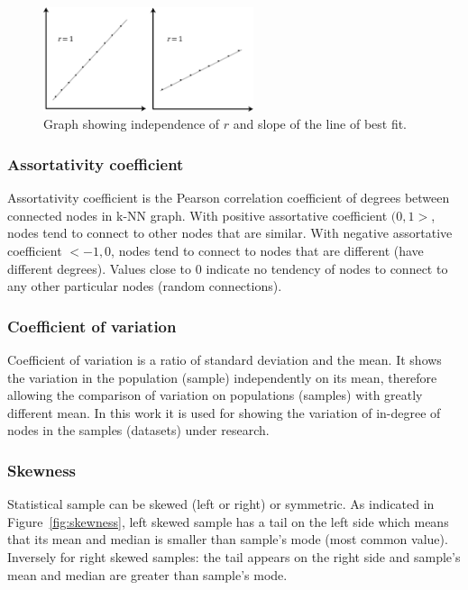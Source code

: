 \begin{figure}[h!]
  \centering
  \captionsetup{width=24pc, justification=centering}
    \includegraphics[width=0.55\textwidth]{images/pearson_graphs_slope.png}
  \caption{Graph showing independence of $r$ and slope of the line of best fit.}
  \label{fig:pearson_graph_slope}
\end{figure}

\subsubsection{Assortativity coefficient}
Assortativity coefficient is the Pearson correlation coefficient of degrees between connected nodes in k-NN graph.
With positive assortative coefficient $(0, 1>$, nodes tend to connect to other nodes that are similar.
With negative assortative coefficient $<-1, 0$, nodes tend to connect to nodes that are different (have different degrees).
Values close to $0$ indicate no tendency of nodes to connect to any other particular nodes (random connections).

\subsubsection{Coefficient of variation}
Coefficient of variation is a ratio of standard deviation and the mean.
It shows the variation in the population (sample) independently on its mean, therefore allowing the comparison of variation on populations (samples) with greatly different mean.
In this work it is used for showing the variation of in-degree of nodes in the samples (datasets) under research.

\subsubsection{Skewness}
Statistical sample can be skewed (left or right) or symmetric.
As indicated in Figure~\ref{fig:skewness}, left skewed sample has a tail on the left side which means that its mean and median is smaller than sample's mode (most common value).
Inversely for right skewed samples: the tail appears on the right side and sample's mean and median are greater than sample's mode.

